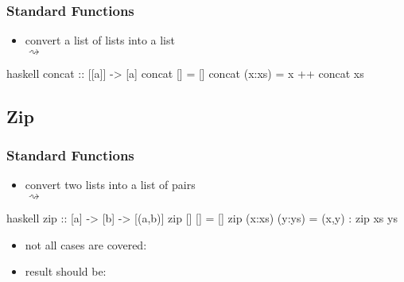 \documentclass[dvipsnames]{beamer}
\theoremstyle{plain}
\begin{document}
\begin{frame}[fragile]
  \frametitle{Standard Functions}

  \begin{itemize}
    \item convert a list of lists into a list\\
      \pygment{haskell}{concat [[2,3], [], [4]} $\rightsquigarrow$
  \end{itemize}

  \begin{exampleblock}{}
    \begin{pygments}{haskell}
concat :: [[a]] -> [a]
concat []     = []
concat (x:xs) = x ++ concat xs
    \end{pygments}
  \end{exampleblock}
\end{frame}

\subsection{Zip}

\begin{frame}[fragile]
  \frametitle{Standard Functions}

  \begin{itemize}
    \item convert two lists into a list of pairs\\
       $\rightsquigarrow$
  \end{itemize}

  \begin{exampleblock}{}
    \begin{pygments}{haskell}
zip :: [a] -> [b] -> [(a,b)]
zip []     []     = []
zip (x:xs) (y:ys) = (x,y) : zip xs ys
    \end{pygments}
  \end{exampleblock}

  \pause
  \begin{itemize}
    \item not all cases are covered:\\
    \item result should be: 
  \end{itemize}
\end{frame}
\end{document}
